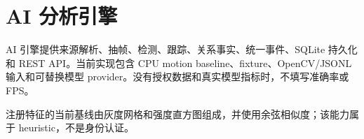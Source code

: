 \section{AI 分析引擎}

AI 引擎提供来源解析、抽帧、检测、跟踪、关系事实、统一事件、SQLite 持久化和 REST API。当前实现包含 CPU motion baseline、fixture、OpenCV/JSONL 输入和可替换模型 provider。没有授权数据和真实模型指标时，不填写准确率或 FPS。

注册特征的当前基线由灰度网格和强度直方图组成，并使用余弦相似度；该能力属于 heuristic，不是身份认证。
